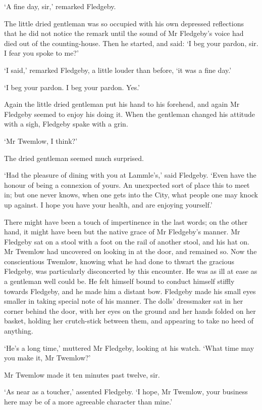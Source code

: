 ‘A fine day, sir,’ remarked Fledgeby.

The little dried gentleman was so occupied with his own depressed
reflections that he did not notice the remark until the sound of Mr
Fledgeby’s voice had died out of the counting-house. Then he started,
and said: ‘I beg your pardon, sir. I fear you spoke to me?’

‘I said,’ remarked Fledgeby, a little louder than before, ‘it was a fine
day.’

‘I beg your pardon. I beg your pardon. Yes.’

Again the little dried gentleman put his hand to his forehead, and again
Mr Fledgeby seemed to enjoy his doing it. When the gentleman changed his
attitude with a sigh, Fledgeby spake with a grin.

‘Mr Twemlow, I think?’

The dried gentleman seemed much surprised.

‘Had the pleasure of dining with you at Lammle’s,’ said Fledgeby. ‘Even
have the honour of being a connexion of yours. An unexpected sort of
place this to meet in; but one never knows, when one gets into the City,
what people one may knock up against. I hope you have your health, and
are enjoying yourself.’

There might have been a touch of impertinence in the last words; on the
other hand, it might have been but the native grace of Mr Fledgeby’s
manner. Mr Fledgeby sat on a stool with a foot on the rail of another
stool, and his hat on. Mr Twemlow had uncovered on looking in at the
door, and remained so. Now the conscientious Twemlow, knowing what he
had done to thwart the gracious Fledgeby, was particularly disconcerted
by this encounter. He was as ill at ease as a gentleman well could be.
He felt himself bound to conduct himself stiffly towards Fledgeby,
and he made him a distant bow. Fledgeby made his small eyes smaller
in taking special note of his manner. The dolls’ dressmaker sat in her
corner behind the door, with her eyes on the ground and her hands folded
on her basket, holding her crutch-stick between them, and appearing to
take no heed of anything.

‘He’s a long time,’ muttered Mr Fledgeby, looking at his watch. ‘What
time may you make it, Mr Twemlow?’

Mr Twemlow made it ten minutes past twelve, sir.

‘As near as a toucher,’ assented Fledgeby. ‘I hope, Mr Twemlow, your
business here may be of a more agreeable character than mine.’

